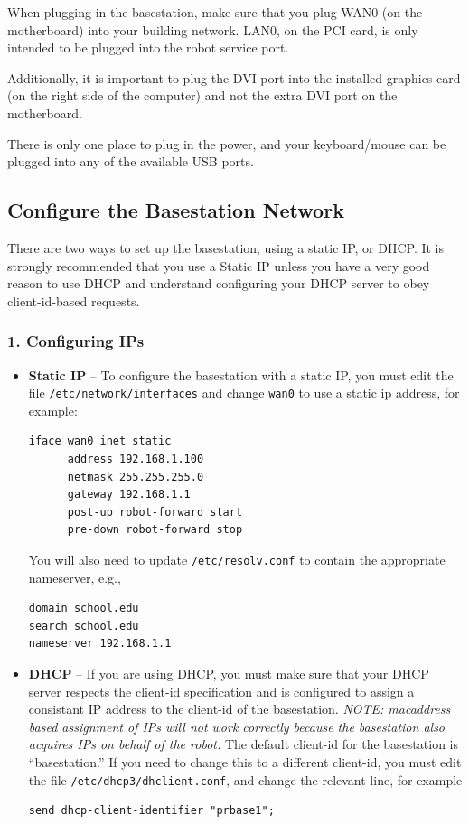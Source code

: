 When plugging in the basestation, make sure that you plug WAN0 (on the
motherboard) into your building network.  LAN0, on the PCI card, is
only intended to be plugged into the robot service port.

Additionally, it is important to plug the DVI port into the installed
graphics card (on the right side of the computer) and not the extra
DVI port on the motherboard.

There is only one place to plug in the power, and your keyboard/mouse
can be plugged into any of the available USB ports.

\subsection{Configure the Basestation Network}

There are two ways to set up the basestation, using a static IP, or
DHCP.  It is strongly recommended that you use a Static IP unless you
have a very good reason to use DHCP and understand configuring your
DHCP server to obey client-id-based requests.

\subsubsection{1. Configuring IPs}

\begin{itemize}
\item \textbf{Static IP} -- To configure the basestation with a static IP, you must edit the file
\texttt{/etc/network/interfaces} and change \texttt{wan0} to use a static ip
address, for example:
\begin{verbatim}
iface wan0 inet static
      address 192.168.1.100
      netmask 255.255.255.0
      gateway 192.168.1.1
      post-up robot-forward start
      pre-down robot-forward stop
\end{verbatim}

You will also need to update \texttt{/etc/resolv.conf} to contain the
appropriate nameserver, e.g.,
\begin{verbatim}
domain school.edu
search school.edu
nameserver 192.168.1.1
\end{verbatim}

\item \textbf{DHCP} -- If you are using DHCP, you must make sure that your DHCP server
respects the client-id specification and is configured to assign a
consistant IP address to the client-id of the basestation.
\textit{NOTE: macaddress based assignment of IPs will not work
  correctly because the basestation also acquires IPs on behalf of the
  robot.}  The default client-id for the basestation is
``basestation.''  If you need to change this to a different client-id,
you must edit the file \texttt{/etc/dhcp3/dhclient.conf}, and change
the relevant line, for example
\begin{verbatim}
send dhcp-client-identifier "prbase1";
\end{verbatim}
\end{itemize}

